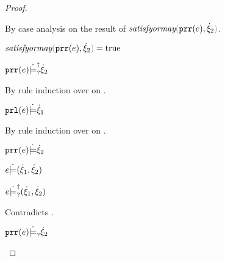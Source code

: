 \begin{proof}
\begin{byCases}
\begin{byCases}
\begin{byCases}
\begin{byCases}
          By case analysis on the result of $\fsatisfyormay{\hprr{e}}{\hxi_2}$.
          \begin{byCases}
            \item[\true]
            \begin{pfsteps*}
            \item $\fsatisfyormay{\hprr{e}}{\hxi_2}=\true$  
            \item $\mathtt{prr}(e) \dot{\models}_{?}^{\dag} \dot{\xi}_2$  
            \end{pfsteps*}  
            By rule induction over  on .
            \begin{byCases}
              \item[\text{(\ref{rule:CSMSSat})}]
              \begin{pfsteps*}
              \item $\mathtt{prl}(e) \dot{\models} \dot{\xi}_1$  
              \end{pfsteps*} 
              By rule induction over  on .
              \begin{byCases}
                \item[\text{(\ref{rule:CSMSSat})}]
                \begin{pfsteps*}
                \item $\mathtt{prr}(e) \dot{\models} \dot{\xi}_2$  
                \item $e \dot{\models} (\dot{\xi}_1 , \dot{\xi}_2)$  
                \item $e \dot{\models}_{?}^{\dag} (\dot{\xi}_1 , \dot{\xi}_2)$ 
                \end{pfsteps*} 
                Contradicts .
                \item[\text{(\ref{rule:CSMSMay})}]
                \begin{pfsteps*}
                \item $\mathtt{prr}(e) \dot{\models}_{?} \dot{\xi}_2$  

\end{pfsteps*}
\end{byCases}
\end{byCases}
\end{byCases}
\end{byCases}
\end{byCases}
\end{byCases}
\end{byCases}
\end{proof}
